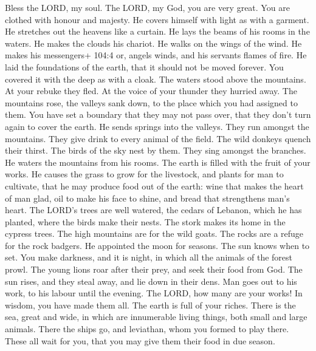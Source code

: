  Bless the LORD, my soul. The LORD, my God, you are very
great. You are clothed with honour and majesty.  He covers
himself with light as with a garment. He stretches out the heavens like
a curtain.  He lays the beams of his rooms in the waters. He
makes the clouds his chariot. He walks on the wings of the wind.
 He makes his messengers+ 104:4 or, angels winds, and his
servants flames of fire.  He laid the foundations of the
earth, that it should not be moved forever.  You covered it
with the deep as with a cloak. The waters stood above the mountains.
 At your rebuke they fled. At the voice of your thunder they
hurried away.  The mountains rose, the valleys sank down, to
the place which you had assigned to them.  You have set a
boundary that they may not pass over, that they don't turn again to
cover the earth.  He sends springs into the valleys. They
run amongst the mountains.  They give drink to every animal
of the field. The wild donkeys quench their thirst.  The
birds of the sky nest by them. They sing amongst the branches.
 He waters the mountains from his rooms. The earth is
filled with the fruit of your works.  He causes the grass
to grow for the livestock, and plants for man to cultivate, that he may
produce food out of the earth:  wine that makes the heart
of man glad, oil to make his face to shine, and bread that strengthens
man's heart.  The LORD's trees are well watered, the cedars
of Lebanon, which he has planted,  where the birds make
their nests. The stork makes its home in the cypress trees.
 The high mountains are for the wild goats. The rocks are a
refuge for the rock badgers.  He appointed the moon for
seasons. The sun knows when to set.  You make darkness, and
it is night, in which all the animals of the forest prowl. 
The young lions roar after their prey, and seek their food from God.
 The sun rises, and they steal away, and lie down in their
dens.  Man goes out to his work, to his labour until the
evening.  The LORD, how many are your works! In wisdom, you
have made them all. The earth is full of your riches. 
There is the sea, great and wide, in which are innumerable living
things, both small and large animals.  There the ships go,
and leviathan, whom you formed to play there.  These all
wait for you, that you may give them their food in due season.
